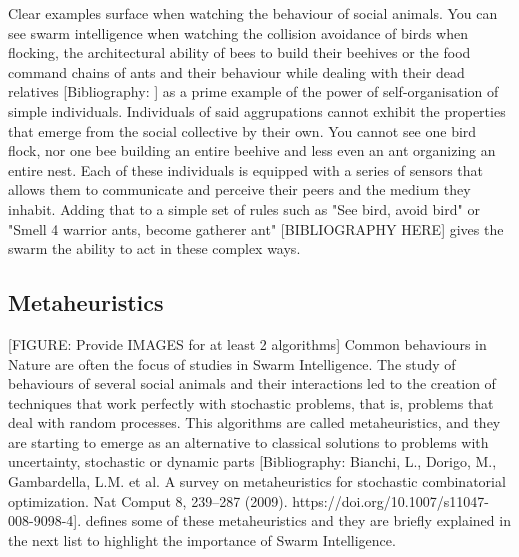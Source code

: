 Clear examples surface when watching the behaviour of social animals. You can see swarm intelligence when watching the collision avoidance of birds when flocking, the architectural ability of bees to build their beehives or the food command chains of ants and their behaviour while dealing with their dead relatives [Bibliography: ] as a prime example of the power of self-organisation of simple individuals. Individuals of said aggrupations cannot exhibit the properties that emerge from the social collective by their own. You cannot see one bird flock, nor one bee building an entire beehive and less even an ant organizing an entire nest. Each of these individuals is equipped with a series of sensors that allows them to communicate and perceive their peers and the medium they inhabit. Adding that to a simple set of rules such as "See bird, avoid bird" or "Smell 4 warrior ants, become gatherer ant" [BIBLIOGRAPHY HERE] gives the swarm the ability to act in these complex ways.

\subsection{Metaheuristics}
[FIGURE: Provide IMAGES for at least 2 algorithms]
Common behaviours in Nature are often the focus of studies in Swarm Intelligence. The study of behaviours of several social animals and their interactions led to the creation of techniques that work perfectly with stochastic problems, that is, problems that deal with random processes. This algorithms are called metaheuristics, and they are starting to emerge as an alternative to classical solutions to problems with uncertainty, stochastic or dynamic parts [Bibliography: Bianchi, L., Dorigo, M., Gambardella, L.M. et al. A survey on metaheuristics for stochastic combinatorial optimization. Nat Comput 8, 239–287 (2009). https://doi.org/10.1007/s11047-008-9098-4]. \citep{B_Swarm_Optimization} defines some of these metaheuristics and they are briefly explained in the next list to highlight the importance of Swarm Intelligence.

